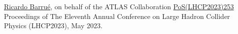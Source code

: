 

\begin{cventries}
    {\underline{Ricardo Barrué}, on behalf of the ATLAS Collaboration}{}
    {\href{https://pos.sissa.it/450/253/}{PoS(LHCP2023)253}}
    {
        Proceedings of The Eleventh Annual Conference on Large Hadron Collider Physics (LHCP2023), May 2023.
    }
\end{cventries}


